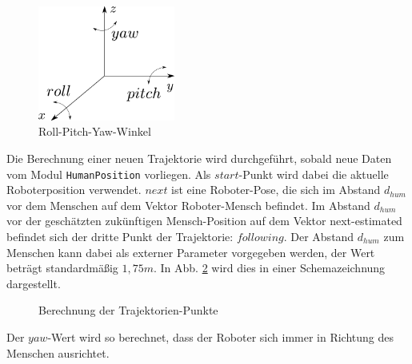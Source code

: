 \begin{figure}
	\center
	\includegraphics[width=0.4\textwidth]{graphics/roll_pitch_yaw}
	\caption{Roll-Pitch-Yaw-Winkel \cite{rollPitchYaw}}
	\label{fig:roll_pitch_yaw}
\end{figure}

Die Berechnung einer neuen Trajektorie wird durchgeführt, sobald neue Daten vom Modul \lstinline{HumanPosition} vorliegen.
Als $start$-Punkt wird dabei die aktuelle Roboterposition verwendet.
$next$ ist eine Roboter-Pose, die sich im Abstand $d_{hum}$ vor dem Menschen auf dem Vektor Roboter-Mensch befindet.
Im Abstand $d_{hum}$ vor der geschätzten zukünftigen Mensch-Position auf dem Vektor next-estimated befindet sich der dritte Punkt der Trajektorie: $following$.
Der Abstand $d_{hum}$ zum Menschen kann dabei als externer Parameter vorgegeben werden, der Wert beträgt standardmäßig $1,75m$.
In Abb. \ref{fig:trajektorie} wird dies in einer Schemazeichnung dargestellt.

\begin{figure}
	\center
	
	\caption{Berechnung der Trajektorien-Punkte}
	\label{fig:trajektorie}
\end{figure}

Der $yaw$-Wert wird so berechnet, dass der Roboter sich immer in Richtung des Menschen ausrichtet.


